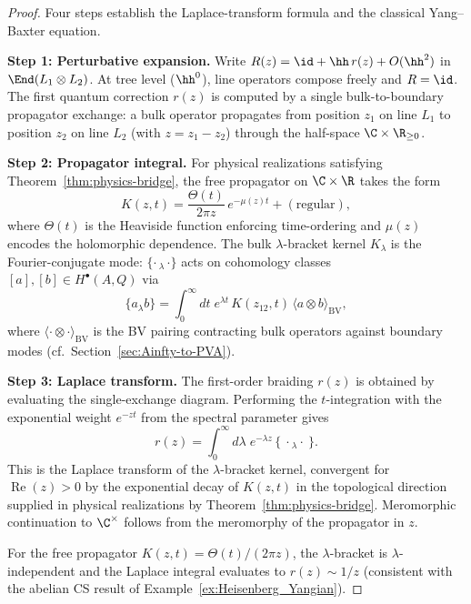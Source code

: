 \begin{proof}
Four steps establish the Laplace-transform formula and the classical Yang--Baxter equation.

\medskip
\noindent\textbf{Step 1: Perturbative expansion.}
Write $R(z) = \id + \hh\, r(z) + O(\hh^2)$ in $\End(L_1 \otimes L_2)$. At tree level ($\hh^0$), line operators compose freely and $R = \id$. The first quantum correction $r(z)$ is computed by a single bulk-to-boundary propagator exchange: a bulk operator propagates from position $z_1$ on line $L_1$ to position $z_2$ on line $L_2$ (with $z = z_1 - z_2$) through the half-space $\C \times \R_{\geq 0}$.

\medskip
\noindent\textbf{Step 2: Propagator integral.}
For physical realizations satisfying
Theorem~\ref{thm:physics-bridge}, the free propagator on
$\C \times \R$ takes the form
\[
K(z,t) = \frac{\Theta(t)}{2\pi z}\, e^{-\mu(z) t} + (\text{regular}),
\]
where $\Theta(t)$ is the Heaviside function enforcing time-ordering and $\mu(z)$ encodes the holomorphic dependence. The bulk $\lambda$-bracket kernel $K_\lambda$ is the Fourier-conjugate mode: $\{\cdot\,{}_\lambda\,\cdot\}$ acts on cohomology classes $[a], [b] \in H^\bullet(A,Q)$ via
\[
\{a_\lambda b\} = \int_0^\infty dt\; e^{\lambda t}\, K(z_{12}, t)\, \langle a \otimes b \rangle_{\mathrm{BV}},
\]
where $\langle \cdot \otimes \cdot \rangle_{\mathrm{BV}}$ is the BV pairing contracting bulk operators against boundary modes (cf.\ Section~\ref{sec:Ainfty-to-PVA}).

\medskip
\noindent\textbf{Step 3: Laplace transform.}
The first-order braiding $r(z)$ is obtained by evaluating the single-exchange diagram. Performing the $t$-integration with the exponential weight $e^{-zt}$ from the spectral parameter gives
\[
r(z) = \int_0^\infty d\lambda\; e^{-\lambda z}\, \{\ \cdot{}_\lambda \cdot\ \}.
\]
This is the Laplace transform of the $\lambda$-bracket kernel,
convergent for $\operatorname{Re}(z) > 0$ by the exponential decay
of $K(z,t)$ in the topological direction supplied in physical
realizations by Theorem~\ref{thm:physics-bridge}. Meromorphic
continuation to $\C^\times$ follows from the meromorphy of the
propagator in $z$.

For the free propagator $K(z,t) = \Theta(t)/(2\pi z)$, the $\lambda$-bracket is $\lambda$-independent and the Laplace integral evaluates to $r(z) \sim 1/z$ (consistent with the abelian CS result of Example~\ref{ex:Heisenberg_Yangian}).


\end{proof}
